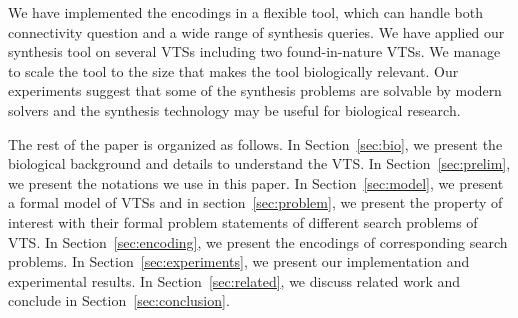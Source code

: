 %


\par We have implemented the encodings in a flexible tool, which can handle both connectivity question and a wide range of synthesis queries. 
%
We have applied our synthesis tool on several VTSs including
two found-in-nature VTSs.
%
We manage to scale the tool to the size that makes the tool biologically relevant. 
%
Our experiments suggest that some of the synthesis problems are solvable by modern solvers and the synthesis technology may be useful for biological research.
%

%
The rest of the paper is organized as follows. 
%
In Section~\ref{sec:bio}, we present the biological background and details to understand the VTS. 
%
In Section~\ref{sec:prelim}, we present the notations we use in this paper. 
%
In Section~\ref{sec:model}, we present a formal model of VTSs and in section~\ref{sec:problem}, we present the property of interest with their formal problem statements of different search problems of VTS.
%
In Section~\ref{sec:encoding}, we present the encodings of corresponding search problems. 
%
In Section~\ref{sec:experiments}, we present our implementation and experimental results. 
%
In Section~\ref{sec:related}, we discuss related work and conclude in Section~\ref{sec:conclusion}.
%
~        
